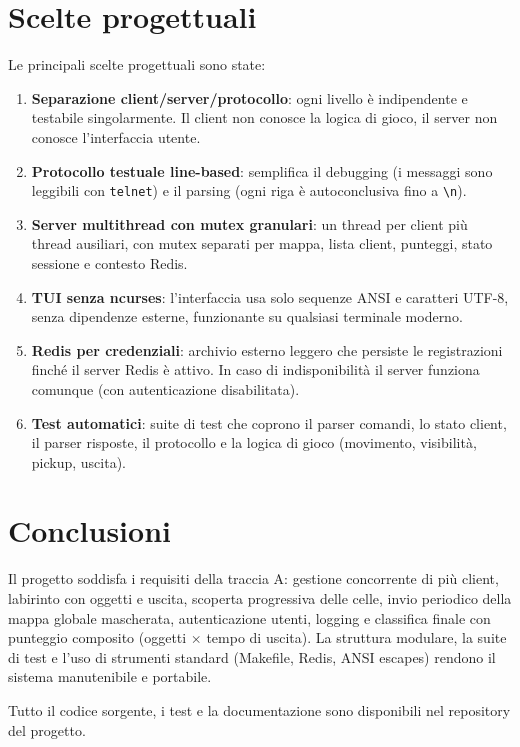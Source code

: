 \documentclass[a4paper,11pt]{article}
\begin{document}
\section{Scelte progettuali}

Le principali scelte progettuali sono state:
\begin{enumerate}[topsep=0.3em]
    \item \textbf{Separazione client/server/protocollo}: ogni livello è
          indipendente e testabile singolarmente. Il client non conosce
          la logica di gioco, il server non conosce l'interfaccia utente.
    \item \textbf{Protocollo testuale line-based}: semplifica il debugging
          (i messaggi sono leggibili con \texttt{telnet}) e il parsing
          (ogni riga è autoconclusiva fino a \texttt{\textbackslash n}).
    \item \textbf{Server multithread con mutex granulari}: un thread per
          client più thread ausiliari, con mutex separati per mappa,
          lista client, punteggi, stato sessione e contesto Redis.
    \item \textbf{TUI senza ncurses}: l'interfaccia usa solo sequenze
          ANSI e caratteri UTF-8, senza dipendenze esterne, funzionante
          su qualsiasi terminale moderno.
    \item \textbf{Redis per credenziali}: archivio esterno leggero che
          persiste le registrazioni finché il server Redis è attivo.
          In caso di indisponibilità il server funziona comunque (con
          autenticazione disabilitata).
    \item \textbf{Test automatici}: suite di test che coprono il parser
          comandi, lo stato client, il parser risposte, il protocollo e
          la logica di gioco (movimento, visibilità, pickup, uscita).
\end{enumerate}

\section{Conclusioni}

Il progetto soddisfa i requisiti della traccia A: gestione concorrente di più
client, labirinto con oggetti e uscita, scoperta progressiva delle celle,
invio periodico della mappa globale mascherata, autenticazione utenti,
logging e classifica finale con punteggio composito (oggetti $\times$ tempo
di uscita). La struttura modulare, la suite di test e l'uso di strumenti
standard (Makefile, Redis, ANSI escapes) rendono il sistema manutenibile
e portabile.

Tutto il codice sorgente, i test e la documentazione sono disponibili
nel repository del progetto.
\end{document}
